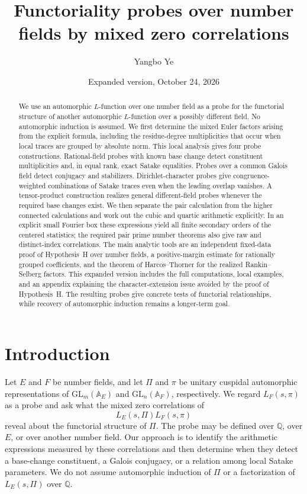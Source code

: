 \documentclass[11pt,reqno]{amsart}
\title[Functoriality probes over number fields]{Functoriality probes over number fields by mixed zero correlations}
\author{Yangbo Ye}
\date{Expanded version, October 24, 2026}
\numberwithin{equation}{section}
\theoremstyle{definition}
\theoremstyle{remark}
\begin{document}
\begin{abstract}
We use an automorphic $L$-function over one number field as a probe for the functorial structure of another automorphic $L$-function over a possibly different field. No automorphic induction is assumed. We first determine the mixed Euler factors arising from the explicit formula, including the residue-degree multiplicities that occur when local traces are grouped by absolute norm. This local analysis gives four probe constructions. Rational-field probes with known base change detect constituent multiplicities and, in equal rank, exact Satake equalities. Probes over a common Galois field detect conjugacy and stabilizers. Dirichlet-character probes give congruence-weighted combinations of Satake traces even when the leading overlap vanishes. A tensor-product construction realizes general different-field probes whenever the required base changes exist. We then separate the pair calculation from the higher connected calculations and work out the cubic and quartic arithmetic explicitly. In an explicit small Fourier box these expressions yield all finite secondary orders of the centered statistics; the required pair prime number theorems also give raw and distinct-index correlations. The main analytic tools are an independent fixed-data proof of Hypothesis~H over number fields, a positive-margin estimate for rationally grouped coefficients, and the theorem of Harcos--Thorner for the realized Rankin--Selberg factors. This expanded version includes the full computations, local examples, and an appendix explaining the character-extension issue avoided by the proof of Hypothesis~H. The resulting probes give concrete tests of functorial relationships, while recovery of automorphic induction remains a longer-term goal.
\end{abstract}
\maketitle
\tableofcontents

\section{Introduction}
Let $E$ and $F$ be number fields, and let $\Pi$ and $\pi$ be unitary cuspidal automorphic representations of $\mathrm{GL}_m(\mathbb A_E)$ and $\mathrm{GL}_n(\mathbb A_F)$, respectively. We regard $L_F(s,\pi)$ as a probe and ask what the mixed zero correlations of
\begin{equation}L_E(s,\Pi)L_F(s,\pi)\label{in:product}\end{equation}
reveal about the functorial structure of $\Pi$. The probe may be defined over $\mathbb Q$, over $E$, or over another number field. Our approach is to identify the arithmetic expressions measured by these correlations and then determine when they detect a base-change constituent, a Galois conjugacy, or a relation among local Satake parameters. We do not assume automorphic induction of $\Pi$ or a factorization of $L_E(s,\Pi)$ over $\mathbb Q$.
\end{document}
